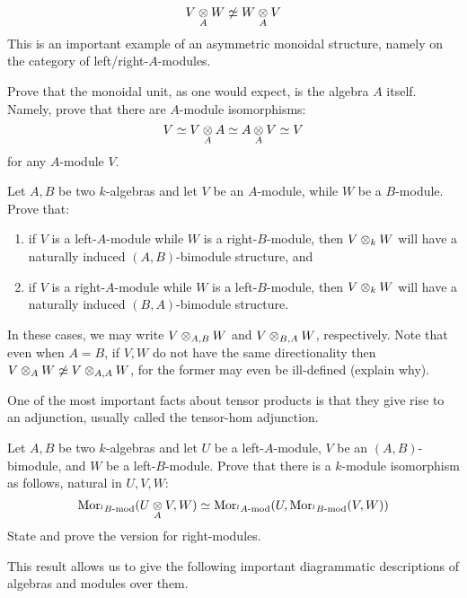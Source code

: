             $$V \tensor_A W \not \cong W \tensor_A V$$
        This is an important example of an asymmetric monoidal structure, namely on the category of left/right-$A$-modules.
        \begin{question}
            Prove that the monoidal unit, as one would expect, is the algebra $A$ itself. Namely, prove that there are $A$-module isomorphisms:
                $$V \cong V \tensor_A A \cong A \tensor_A V \cong V$$
            for any $A$-module $V$.
        \end{question}
        \begin{question}
            Let $A, B$ be two $k$-algebras and let $V$ be an $A$-module, while $W$ be a $B$-module. Prove that:
            \begin{enumerate}
                \item if $V$ is a left-$A$-module while $W$ is a right-$B$-module, then $V \tensor_k W$ will have a naturally induced $(A, B)$-bimodule structure, and
                \item if $V$ is a right-$A$-module while $W$ is a left-$B$-module, then $V \tensor_k W$ will have a naturally induced $(B, A)$-bimodule structure.
            \end{enumerate}
            In these cases, we may write $V \tensor_{A, B} W$ and $V \tensor_{B, A} W$, respectively. Note that even when $A = B$, if $V, W$ do not have the same directionality then $V \tensor_A W \not \cong V \tensor_{A, A} W$, for the former may even be ill-defined (explain why).
        \end{question}
        One of the most important facts about tensor products is that they give rise to an adjunction, usually called the tensor-hom adjunction.
        \begin{question}
            Let $A, B$ be two $k$-algebras and let $U$ be a left-$A$-module, $V$ be an $(A, B)$-bimodule, and $W$ be a left-$B$-module. Prove that there is a $k$-module isomorphism as follows, natural in $U, V, W$:
                $$\Mor_{ {}^lB\mod }(U \tensor_A V, W) \cong \Mor_{ {}^lA\mod }(U, \Mor_{ {}^lB\mod }(V, W))$$
            State and prove the version for right-modules.
        \end{question}
        This result allows us to give the following important diagrammatic descriptions of algebras and modules over them. 
